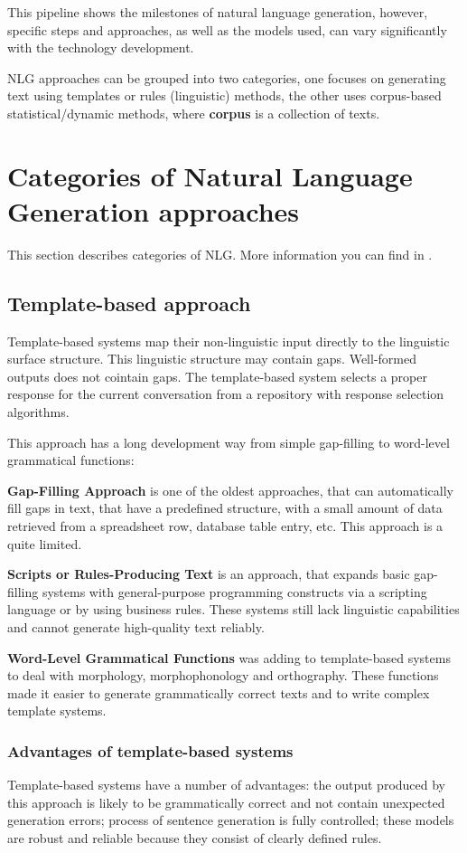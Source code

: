 This pipeline shows the milestones of natural language generation, however, specific steps and approaches, as well as the models used, can vary significantly with the technology development.

NLG approaches can be grouped into two categories, one focuses on generating text using templates or rules (linguistic) methods, the other uses corpus-based statistical/dynamic methods, where \textbf{corpus} is a collection of texts.

\section{Categories of Natural Language Generation approaches}
This section describes categories of NLG. More information you can find in \cite{stochastic_language_generation_ds} \cite{survey_on_ds} \cite{data_driven_nlg}.

\subsection{Template-based approach} 
Template-based systems map their non-linguistic input directly to the linguistic surface structure. This linguistic structure may contain gaps. Well-formed outputs does not cointain gaps.
The template-based system selects a proper response for the current conversation from a repository with response selection algorithms. 

This approach has a long development way from simple gap-filling to word-level grammatical functions:

\textbf{Gap-Filling Approach} is one of the oldest approaches, that can automatically fill gaps in text, that have a predefined structure, with a small amount of data retrieved from a spreadsheet row, database table entry, etc. This approach is a quite limited.

\textbf{Scripts or Rules-Producing Text} is an approach, that expands basic gap-filling systems with general-purpose programming constructs via a scripting language or by using business rules. These systems still lack linguistic capabilities and cannot generate high-quality text reliably.

\textbf{Word-Level Grammatical Functions} was adding to template-based systems to deal with morphology, morphophonology and orthography. These functions made it easier to generate grammatically correct texts and to write complex template systems.

\subsubsection{Advantages of template-based systems}
Template-based systems have a number of advantages: the output produced by this approach is likely to be grammatically correct and not contain unexpected generation errors; process of sentence generation is fully controlled; these models are robust and reliable because they consist of clearly defined rules.

